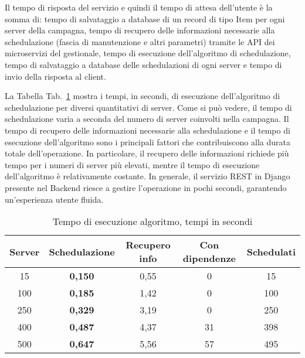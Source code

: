 Il tempo di risposta del servizio e quindi il tempo di attesa dell’utente è 
la somma di: tempo di salvataggio a database di un record di tipo Item per 
ogni server della campagna, tempo di recupero delle informazioni necessarie 
alla schedulazione (fascia di manutenzione e altri parametri) tramite le API 
dei microservizi del gestionale, tempo di esecuzione dell'algoritmo di 
schedulazione, tempo di salvataggio a database delle schedulazioni di ogni 
server e tempo di invio della risposta al client.

La Tabella Tab.~\ref{tab:algo-exec} mostra i tempi, in secondi, di esecuzione 
dell'algoritmo di schedulazione per diversi quantitativi di server. Come si 
può vedere, il tempo di schedulazione varia a seconda del numero di server 
coinvolti nella campagna. Il tempo di recupero delle informazioni necessarie 
alla schedulazione e il tempo di esecuzione dell'algoritmo sono i principali 
fattori che contribuiscono alla durata totale dell'operazione. In particolare, 
il recupero delle informazioni richiede più tempo per i numeri di server più 
elevati, mentre il tempo di esecuzione dell'algoritmo è relativamente costante. 
In generale, il servizio REST in Django presente nel Backend riesce a gestire 
l'operazione in pochi secondi, garantendo un'esperienza utente fluida.\\

\begin {table}[H]
\begin{center}
\begin{tabular}{|c|c|c|c|c|}
  
  \hline
  \rowcolor[gray]{.66}
  \textbf{Server} & \textbf{Schedulazione} & \textbf{Recupero info} & \textbf{Con dipendenze} & \textbf{Schedulati}\\
  
  \hline
  \rowcolor[gray]{.87}15 & \textbf{0,150} & 0,55 & 0 & 15 \\
  \rowcolor[gray]{.95}100 & \textbf{0,185} & 1,42 & 0 & 100 \\
  \rowcolor[gray]{.87}250 & \textbf{0,329} & 3,19 & 0 & 250 \\
  \rowcolor[gray]{.95}400 & \textbf{0,487} & 4,37 & 31 & 398 \\
  \rowcolor[gray]{.87}500 & \textbf{0,647} & 5,56 & 57 & 495 \\
  \hline
\end{tabular} 
\caption {Tempo di esecuzione algoritmo, tempi in secondi} \label{tab:algo-exec}
\end{center}
\end{table}


